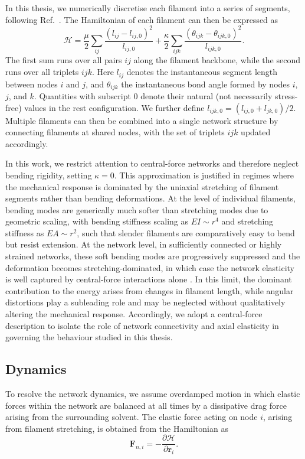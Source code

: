 In this thesis, we numerically discretise each filament into a series of segments, following Ref.~\cite{mackintosh_elasticity_1995}. The Hamiltonian of each filament can then be expressed as
\begin{equation}
    \mathcal{H} = \frac{\mu}{2} \sum_{ij} \frac{( l_{ij} - l_{ij,0} )^2}{l_{ij,0}} + \frac{\kappa}{2} \sum_{ijk} \frac{( \theta_{ijk} - \theta_{ijk,0} )^2}{l_{ijk,0}}.
    \label{eq:NetworkHamiltonian}
\end{equation}
The first sum runs over all pairs $ij$ along the filament backbone, while the second runs over all triplets $ijk$. Here $l_{ij}$ denotes the instantaneous segment length between nodes $i$ and $j$, and $\theta_{ijk}$ the instantaneous bond angle formed by nodes $i$, $j$, and $k$. Quantities with subscript $0$ denote their natural (not necessarily stress-free) values in the rest configuration. We further define $l_{ijk,0} = (l_{ij,0} + l_{jk,0})/2$. Multiple filaments can then be combined into a single network structure by connecting filaments at shared nodes, with the set of triplets $ijk$ updated accordingly. 

In this work, we restrict attention to central-force networks and therefore neglect bending rigidity, setting $\kappa = 0$. This approximation is justified in regimes where the mechanical response is dominated by the uniaxial stretching of filament segments rather than bending deformations. At the level of individual filaments, bending modes are generically much softer than stretching modes due to geometric scaling, with bending stiffness scaling as $EI \sim r^4$ and stretching stiffness as $EA \sim r^2$, such that slender filaments are comparatively easy to bend but resist extension. At the network level, in sufficiently connected or highly strained networks, these soft bending modes are progressively suppressed and the deformation becomes stretching-dominated, in which case the network elasticity is well captured by central-force interactions alone \cite{mackintosh_elasticity_1995,broedersz_criticality_2011,shivers_scaling_2019}. In this limit, the dominant contribution to the energy arises from changes in filament length, while angular distortions play a subleading role and may be neglected without qualitatively altering the mechanical response. Accordingly, we adopt a central-force description to isolate the role of network connectivity and axial elasticity in governing the behaviour studied in this thesis.

\subsection{Dynamics} \label{sec:NetworkDynamics}
To resolve the network dynamics, we assume overdamped motion in which elastic forces within the network are balanced at all times by a dissipative drag force arising from the surrounding solvent. The elastic force acting on node $i$, arising from filament stretching, is obtained from the Hamiltonian as
\begin{equation}
    \bm{F}_{n,i}=-\frac{\partial \mathcal{H}}{\partial \bm{r}_i}.
\end{equation}

